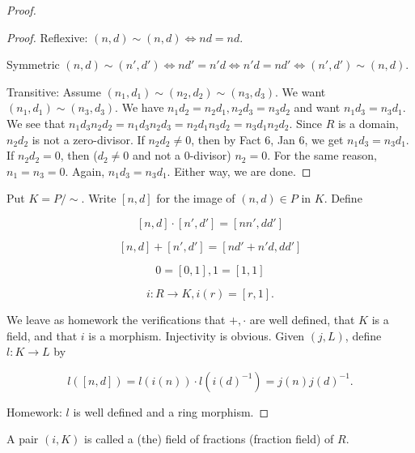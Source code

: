 \begin{proof}
\begin{claim}
\begin{proof}
Reflexive: $(n,d)\sim(n,d)\iff nd=nd.$

Symmetric $(n,d)\sim(n',d')\iff nd'=n'd\iff n'd=nd'\iff (n',d')\sim (n,d).$

Transitive: Assume $(n_1,d_1)\sim(n_2,d_2)\sim(n_3,d_3)$. We want $(n_1,d_1)\sim(n_3,d_3).$
We have $n_1d_2=n_2d_1,n_2d_3=n_3d_2$ and want $n_1d_3=n_3d_1.$
We see that $n_1d_3 n_2d_2=n_1d_3n_2d_3=n_2d_1n_3d_2=n_3d_1n_2d_2.$
Since $R$ is a domain, $n_2d_2$ is not a zero-divisor. If $n_2d_2\ne 0$, then by Fact 6, Jan 6, we get $n_1d_3=n_3d_1$. If $n_2d_2=0$, then ($d_2\ne 0$ and not a 0-divisor) $n_2=0$. For the same reason, $n_1=n_3=0.$ Again, $n_1d_3=n_3d_1$. Either way, we are done.
\end{proof}
\end{claim}

Put $K=P/\sim.$ Write $[n,d]$ for the image of $(n,d)\in P$ in $K$. Define

$$[n,d]\cdot[n',d']=[nn',dd']$$

$$[n,d]+[n',d']=[nd'+n'd,dd']$$

$$0=[0,1],1=[1,1]$$

$$i:R\rightarrow K, i(r)=[r,1].$$

We leave as homework the verifications that $+,\cdot$ are well defined, that $K$ is a field, and that $i$ is a morphism. Injectivity is obvious. Given $(j,L)$, define $l:K\longrightarrow L$ by

$$l([n,d])=l(i(n))\cdot l(i(d)^{-1})=j(n)j(d)^{-1}.$$

Homework: $l$ is well defined and a ring morphism.

\end{proof}

\begin{defn}

A pair $(i,K)$ is called a (the) field of fractions (fraction field) of $R$.

\end{defn}

